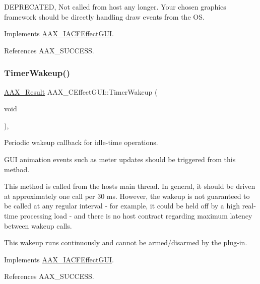 D\+E\+P\+R\+E\+C\+A\+T\+ED, Not called from host any longer. Your chosen graphics framework should be directly handling draw events from the OS. 



Implements \mbox{\hyperlink{a01665_a4b132a0bc22ba443027998a56e4eadfb}{A\+A\+X\+\_\+\+I\+A\+C\+F\+Effect\+G\+UI}}.



References A\+A\+X\+\_\+\+S\+U\+C\+C\+E\+SS.

\mbox{\label{a01477_a0b7bada7e7d72da637bde2daa79f71ee}} 
\subsubsection{\texorpdfstring{TimerWakeup()}{TimerWakeup()}}
{\footnotesize\ttfamily \mbox{\hyperlink{a00392_a4d8f69a697df7f70c3a8e9b8ee130d2f}{A\+A\+X\+\_\+\+Result}} A\+A\+X\+\_\+\+C\+Effect\+G\+U\+I\+::\+Timer\+Wakeup (\begin{DoxyParamCaption}\item[{void}]{ }\end{DoxyParamCaption})\hspace{0.3cm}{\ttfamily [inline]}, {\ttfamily [virtual]}}



Periodic wakeup callback for idle-\/time operations. 

G\+UI animation events such as meter updates should be triggered from this method.

This method is called from the host\textquotesingle{}s main thread. In general, it should be driven at approximately one call per 30 ms. However, the wakeup is not guaranteed to be called at any regular interval -\/ for example, it could be held off by a high real-\/time processing load -\/ and there is no host contract regarding maximum latency between wakeup calls.

This wakeup runs continuously and cannot be armed/disarmed by the plug-\/in. 

Implements \mbox{\hyperlink{a01665_aafa484110d39046de1f927f30c9da387}{A\+A\+X\+\_\+\+I\+A\+C\+F\+Effect\+G\+UI}}.



References A\+A\+X\+\_\+\+S\+U\+C\+C\+E\+SS.

\mbox{\label{a01477_aa86943fbaf8920b533ea31a7669fb009}} 
